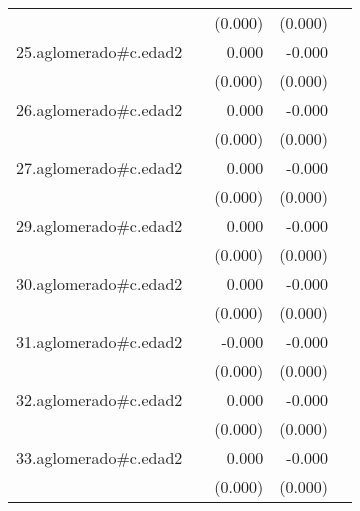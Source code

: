 {\begin{longtable}{l*{4}{D{.}{.}{-1}}}
            &                     &     (0.000)         &     (0.000)         &                     \\
\addlinespace
25.aglomerado#c.edad2&                     &       0.000         &      -0.000         &                     \\
            &                     &     (0.000)         &     (0.000)         &                     \\
\addlinespace
26.aglomerado#c.edad2&                     &       0.000         &      -0.000         &                     \\
            &                     &     (0.000)         &     (0.000)         &                     \\
\addlinespace
27.aglomerado#c.edad2&                     &       0.000         &      -0.000         &                     \\
            &                     &     (0.000)         &     (0.000)         &                     \\
\addlinespace
29.aglomerado#c.edad2&                     &       0.000         &      -0.000         &                     \\
            &                     &     (0.000)         &     (0.000)         &                     \\
\addlinespace
30.aglomerado#c.edad2&                     &       0.000         &      -0.000         &                     \\
            &                     &     (0.000)         &     (0.000)         &                     \\
\addlinespace
31.aglomerado#c.edad2&                     &      -0.000         &      -0.000\sym{***}&                     \\
            &                     &     (0.000)         &     (0.000)         &                     \\
\addlinespace
32.aglomerado#c.edad2&                     &       0.000         &      -0.000\sym{**} &                     \\
            &                     &     (0.000)         &     (0.000)         &                     \\
\addlinespace
33.aglomerado#c.edad2&                     &       0.000         &      -0.000\sym{*}  &                     \\
            &                     &     (0.000)         &     (0.000)         &                     \\

\end{longtable}}
